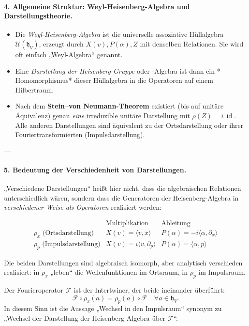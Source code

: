 \documentclass[10pt, letterpaper]{article}
\newcommand{\id}{\operatorname{id}}
\begin{document}
\paragraph{4. Allgemeine Struktur: Weyl-Heisenberg-Algebra und Darstellungstheorie.}

\begin{itemize}
\item Die \emph{Weyl-Heisenberg-Algebra} ist die universelle assoziative Hüllalgebra
$\mathcal{U}(\mathfrak{h}_V)$, erzeugt durch $X(v),P(\alpha),Z$
mit denselben Relationen.
Sie wird oft einfach „Weyl-Algebra“ genannt.

\item Eine \emph{Darstellung der Heisenberg-Gruppe} oder -Algebra
ist dann ein *-Homomorphismus* dieser Hüllalgebra in die Operatoren auf einem Hilbertraum.

\item Nach dem \textbf{Stein–von Neumann-Theorem}
existiert (bis auf unitäre Äquivalenz) genau \emph{eine} irreduzible unitäre Darstellung
mit $\rho(Z)=i\,\id$.
Alle anderen Darstellungen sind äquivalent zu der Ortsdarstellung
oder ihrer Fouriertransformierten (Impulsdarstellung).
\end{itemize}

---

\paragraph{5. Bedeutung der Verschiedenheit von Darstellungen.}

„Verschiedene Darstellungen“ heißt hier nicht,
dass die algebraischen Relationen unterschiedlich wären,
sondern dass die Generatoren der Heisenberg-Algebra
in \emph{verschiedener Weise als Operatoren} realisiert werden:

\[
\begin{array}{c|cc}
 & \text{Multiplikation} & \text{Ableitung} \\ \hline
\rho_x\text{ (Ortsdarstellung)} & X(v)=\langle v,x\rangle & P(\alpha)=-i\langle\alpha,\partial_x\rangle \\
\rho_p\text{ (Impulsdarstellung)} & X(v)=i\langle v,\partial_p\rangle & P(\alpha)=\langle\alpha,p\rangle
\end{array}
\]

Die beiden Darstellungen sind algebraisch isomorph,
aber analytisch verschieden realisiert:
in $\rho_x$ „leben“ die Wellenfunktionen im Ortsraum, in $\rho_p$ im Impulsraum.

Der Fourieroperator $\mathcal{F}$ ist der Intertwiner, der beide ineinander überführt:
\[
\mathcal{F}\circ \rho_x(a) = \rho_p(a)\circ\mathcal{F}\quad\forall a\in\mathfrak{h}_V.
\]
In diesem Sinn ist die Aussage
„Wechsel in den Impulsraum“ synonym zu
„Wechsel der Darstellung der Heisenberg-Algebra über $\mathcal{F}$“.
\end{document}
